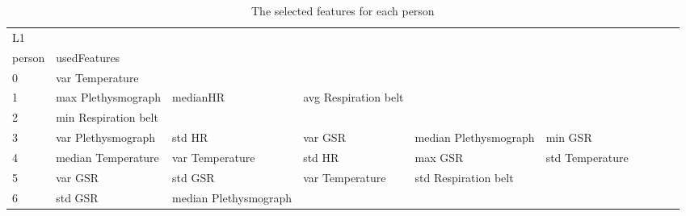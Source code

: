 \begin{landscape}
\begin{table}[]
\centering
\caption{The selected features for each person}
\begin{tabular}{l|llllllll}
L1       &                         &                       &                         &                         &                         &                       &                      &          &                      &        \\
person   & usedFeatures            &                       &                         &                         &                         &                       &                      &          &                      &        \\
0        & var Temperature         &                       &                         &                         &                         &                       &                      &          &                      &        \\
1        & max Plethysmograph      & medianHR              & avg Respiration belt    &                         &                         &                       &                      &          &                      &        \\
2        & min Respiration belt    &                       &                         &                         &                         &                       &                      &          &                      &        \\
3        & var Plethysmograph      & std HR                & var GSR                 & median Plethysmograph   & min GSR                 &                       &                      &          &                      &        \\
4        & median Temperature      & var Temperature       & std HR                  & max GSR                 & std Temperature         &                       &                      &          &                      &        \\
5        & var GSR                 & std GSR               & var Temperature         & std Respiration belt    &                         &                       &                      &          &                      &        \\
6        & std GSR                 & median Plethysmograph &                         &                         &                         &                       &                      &          &                      &        \\

\end{tabular}
\end{table}
\end{landscape}
